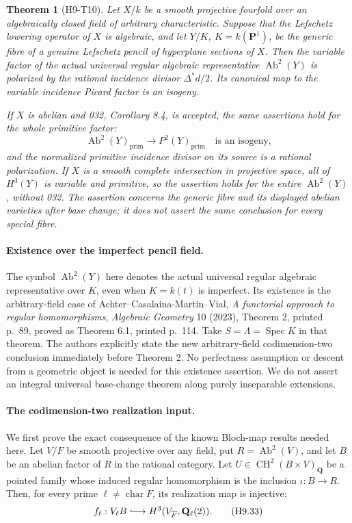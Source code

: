 \documentclass[11pt,a4paper]{article}
\newtheorem{theorem}{Theorem}[section]
\begin{document}
\begin{theorem}[H9-T10]
Let $X/k$ be a smooth projective fourfold over an algebraically closed
field of arbitrary characteristic. Suppose that the Lefschetz lowering
operator of $X$ is algebraic, and let $Y/K$, $K=k(\mathbf P^1)$, be the
generic fibre of a genuine Lefschetz pencil of hyperplane sections of
$X$. Then the variable factor of the actual universal regular algebraic
representative $\operatorname{Ab}^2(Y)$ is polarized by the rational
incidence divisor $\Delta^*d/2$. Its canonical map to the variable
incidence Picard factor is an isogeny.

If $X$ is abelian and 032, Corollary 8.4, is accepted, the same assertions
hold for the whole primitive factor:
\[
 \operatorname{Ab}^2(Y)_{\mathrm{prim}}
          \longrightarrow P^2(Y)_{\mathrm{prim}}
       \quad\text{is an isogeny,}                           \tag{H9.32}
\]
and the normalized primitive incidence divisor on its source is a
rational polarization. If $X$ is a smooth complete intersection in
projective space, all of $H^3(Y)$ is variable and primitive, so the
assertion holds for the entire $\operatorname{Ab}^2(Y)$, without 032.
The assertion concerns the generic fibre and its displayed abelian
varieties after base change; it does not assert the same conclusion
for every special fibre.
\end{theorem}

\paragraph{Existence over the imperfect pencil field.}
The symbol $\operatorname{Ab}^2(Y)$ here denotes the actual universal
regular algebraic representative over $K$, even when $K=k(t)$ is
imperfect. Its existence is the arbitrary-field case of
Achter--Casalaina-Martin--Vial, \emph{A functorial approach to regular
homomorphisms}, \emph{Algebraic Geometry} 10 (2023), Theorem 2,
printed p.~89, proved as Theorem 6.1, printed p.~114. Take
$S=\Lambda=\operatorname{Spec}K$ in that theorem. The authors explicitly
state the new arbitrary-field codimension-two conclusion immediately
before Theorem 2. No perfectness assumption or descent from a geometric
object is needed for this existence assertion. We do not assert an
integral universal base-change theorem along purely inseparable
extensions.

\paragraph{The codimension-two realization input.}
We first prove the exact consequence of the known Bloch-map results
needed here. Let $V/F$ be smooth projective over any field, put
$R=\operatorname{Ab}^2(V)$, and let $B$ be an abelian factor of $R$ in
the rational category. Let $U\in\operatorname{CH}^2(B\times V)_{\mathbf Q}$
be a pointed family whose induced regular homomorphism is the inclusion
$\iota:B\to R$. Then, for every prime $\ell\ne\operatorname{char}F$,
its realization map is injective:
\[
 f_\ell:V_\ell B\lhook\joinrel\longrightarrow
                   H^3(V_{\overline F},\mathbf Q_\ell(2)).  \tag{H9.33}
\]
\end{document}
